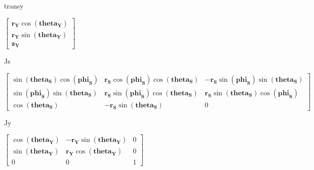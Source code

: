 \documentclass[
  a4paper,
  DIV=11,
  numbers=noendperiod]{scrreprt}
\newenvironment{Shaded}{\begin{snugshade}}{\end{snugshade}}
\newcommand{\NormalTok}[1]{\textcolor[rgb]{0.00,0.23,0.31}{#1}}
\begin{document}
\begin{Shaded}
\begin{Highlighting}[]
\NormalTok{transy}
\end{Highlighting}
\end{Shaded}

$\displaystyle \left[\begin{matrix}\mathbf{{r}_{Y}} \cos{\left(\mathbf{{theta}_{Y}} \right)}\\\mathbf{{r}_{Y}} \sin{\left(\mathbf{{theta}_{Y}} \right)}\\\mathbf{{z}_{Y}}\end{matrix}\right]$

\begin{Shaded}
\begin{Highlighting}[]
\NormalTok{Js}
\end{Highlighting}
\end{Shaded}

$\displaystyle \left[\begin{matrix}\sin{\left(\mathbf{{theta}_{S}} \right)} \cos{\left(\mathbf{{phi}_{S}} \right)} & \mathbf{{r}_{S}} \cos{\left(\mathbf{{phi}_{S}} \right)} \cos{\left(\mathbf{{theta}_{S}} \right)} & - \mathbf{{r}_{S}} \sin{\left(\mathbf{{phi}_{S}} \right)} \sin{\left(\mathbf{{theta}_{S}} \right)}\\\sin{\left(\mathbf{{phi}_{S}} \right)} \sin{\left(\mathbf{{theta}_{S}} \right)} & \mathbf{{r}_{S}} \sin{\left(\mathbf{{phi}_{S}} \right)} \cos{\left(\mathbf{{theta}_{S}} \right)} & \mathbf{{r}_{S}} \sin{\left(\mathbf{{theta}_{S}} \right)} \cos{\left(\mathbf{{phi}_{S}} \right)}\\\cos{\left(\mathbf{{theta}_{S}} \right)} & - \mathbf{{r}_{S}} \sin{\left(\mathbf{{theta}_{S}} \right)} & 0\end{matrix}\right]$

\begin{Shaded}
\begin{Highlighting}[]
\NormalTok{Jy}
\end{Highlighting}
\end{Shaded}

$\displaystyle \left[\begin{matrix}\cos{\left(\mathbf{{theta}_{Y}} \right)} & - \mathbf{{r}_{Y}} \sin{\left(\mathbf{{theta}_{Y}} \right)} & 0\\\sin{\left(\mathbf{{theta}_{Y}} \right)} & \mathbf{{r}_{Y}} \cos{\left(\mathbf{{theta}_{Y}} \right)} & 0\\0 & 0 & 1\end{matrix}\right]$
\end{document}
